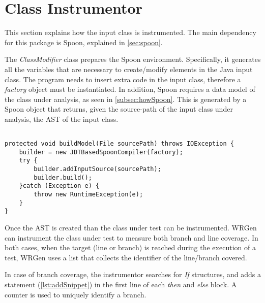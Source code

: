 \section{Class Instrumentor}\label{sec:ClassInstr}
This section explains how the input class is instrumented. The main dependency for this package is Spoon, explained in \autoref{sec:spoon}.

The \emph{ClassModifier} class prepares the Spoon environment.
Specifically, it generates all the variables that are necessary to create/modify elements in the Java input class. The program needs to insert extra code in the input class, therefore a \emph{factory} object must be instantiated. In addition, Spoon requires a data model of the class under analysis, as seen in \autoref{subsec:howSpoon}. This is generated by a Spoon object that returns, given the source-path of the input class under analysis, the AST of the input class.

\begin{lstlisting}[caption={The function to create the AST from the ClassModifier class},label={lst:ASTmodel}]% Start your code-block

protected void buildModel(File sourcePath) throws IOException {
	builder = new JDTBasedSpoonCompiler(factory);		
	try {
		builder.addInputSource(sourcePath);
		builder.build();
	}catch (Exception e) {
		throw new RuntimeException(e);
	}		
}
\end{lstlisting}

Once the AST is created than the class under test can be instrumented. WRGen can instrument the class under test to measure both branch and line coverage. In both cases, when the target (line or branch) is reached during the execution of a test, WRGen uses a list that collects the identifier of the line/branch covered.


In case of branch coverage, the instrumentor searches for \emph{If} structures, and adds a statement (\autoref{lst:addSnippet}) in the first line of each \emph{then} and \emph{else} block. A counter is used to uniquely identify a branch.

